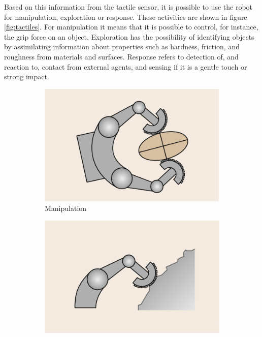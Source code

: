 \documentclass[USenglish]{ifimaster}  %
\begin{document}
Based on this information from the tactile sensor, it is possible to use the robot for manipulation, exploration or response. These activities are shown in figure \ref{fig:tactiles}. For manipulation it means that it is possible to control, for instance, the grip force on an object. Exploration has the possibility of identifying objects by assimilating information about properties such as hardness, friction, and roughness from materials and surfaces. Response refers to detection of, and reaction to, contact from external agents, and sensing if it is a gentle touch or strong impact.

	\begin{figure}
	\centering
	\begin{subfigure}[b]{0.32\textwidth}
		\centering
		\includegraphics[width=\linewidth]{Figures/tactiles1}
		\caption{Manipulation}
		\label{fig:tact1}
	\end{subfigure}\hfill
	\begin{subfigure}[b]{0.32\textwidth}
		\centering
		\includegraphics[width=\linewidth]{Figures/tactiles2}

\end{subfigure}
\end{figure}
\end{document}

